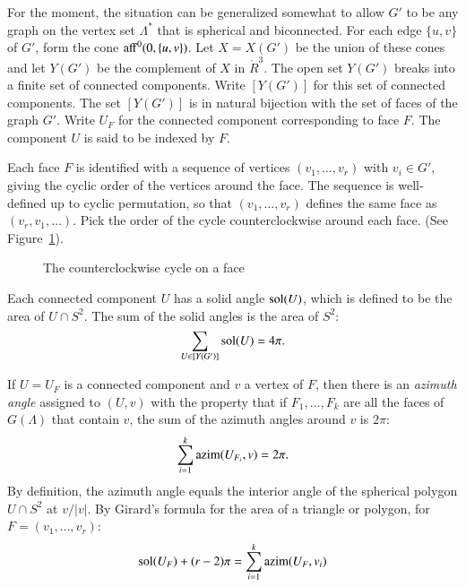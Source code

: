 \documentclass{article} %
\begin{document}
For the moment, the situation can be generalized somewhat to allow
$G'$ to be any graph on the vertex set $\Lambda^*$ that is spherical and
biconnected. For each edge $\{u,v\}$ of $G'$, form the cone
${\operatorname{aff}}^0(0,\{u,v\})$. Let $X=X(G')$ be the union of these cones and
let $Y(G')$ be the complement of $X$ in $\ring{R}^3$. The open set
$Y(G')$ breaks into a finite set of connected components. Write
$[Y(G')]$ for this set of connected components. The set $[Y(G')]$ is
in natural bijection with the set of faces of the graph $G'$. Write
$U_F$ for the connected component corresponding to face $F$. The
component $U$ is said to be indexed by $F$.

Each face $F$ is identified with a sequence of vertices
$(v_1,\ldots,v_r)$ with $v_i\in G'$, giving the cyclic order of the
vertices around the face. The sequence is well-defined up to cyclic
permutation, so that $(v_1,\ldots,v_r)$ defines the same face as
$(v_r,v_1,\ldots)$. Pick the order of the cycle counterclockwise
around each face.  (See Figure~\ref{fig:counter}).


\begin{figure}[htb]
  \begin{center}
   \end{center}
  \caption{The counterclockwise cycle on a face}
\label{fig:counter}
\end{figure}

Each connected component $U$ has a solid angle $\operatorname{sol}(U)$, which
is defined to be the area of $U\cap S^2$.  The sum of the
solid angles is the area of $S^2$:
$$
\sum_{U\in[Y(G')]} \operatorname{sol}(U) = 4\pi.
$$

If $U=U_F$ is a connected component and $v$ a vertex of $F$, then there
is an {\it azimuth angle} assigned to $(U,v)$ with the property
that if $F_1,\ldots,F_k$ are all the faces of $G(\Lambda)$
that contain $v$, the sum of the azimuth angles around
$v$ is $2\pi$:
$$
\sum_{i=1}^k {\operatorname{azim}}(U_{F_i},v) = 2\pi.
$$
By definition, the azimuth angle equals the interior angle of the
spherical polygon $U\cap S^2$ at $v/|v|$. By Girard's formula for the
area of a triangle or polygon, for 
$F = (v_1,\ldots,v_r)$:
  \begin{equation}
  \operatorname{sol}(U_F) + (r-2)\pi = \sum_{i=1}^k {\operatorname{azim}}(U_F,v_i)
  \end{equation}
\end{document}
